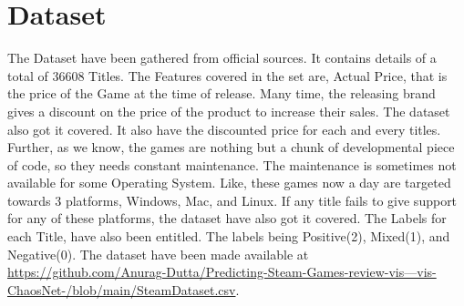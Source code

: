 \documentclass[runningheads]{llncs}
\begin{document}
\section{Dataset}
The Dataset have been gathered from official sources. It contains details of a total of 36608 Titles. The Features covered in the set are, Actual Price, that is the price of the Game at the time of release. Many time, the releasing brand gives a discount on the price of the product to increase their sales. The dataset also got it covered. It also have the discounted price for each and every titles. Further, as we know, the games are nothing but a chunk of developmental piece of code, so they needs constant maintenance. The maintenance is sometimes not available for some Operating System. Like, these games now a day are targeted towards 3 platforms, Windows, Mac, and Linux. If any title fails to give support for any of these platforms, the dataset have also got it covered. The Labels for each Title, have also been entitled. The labels being Positive(2), Mixed(1), and Negative(0). The dataset have been made available at \href{https://github.com/Anurag-Dutta/Predicting-Steam-Games-review-vis---vis-ChaosNet-/blob/main/SteamDataset.csv}{https://github.com/Anurag-Dutta/Predicting-Steam-Games-review-vis---vis-ChaosNet-/blob/main/SteamDataset.csv}. 
\end{document}
